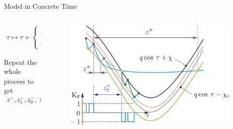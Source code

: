 \begin{frame}{Model in Concrete Time}
	\vspace{-1em}
	\begin{columns}
		\begin{column}{.5 \textwidth}
			\begin{align*}
				\tau \mapsto  \tau + \begin{cases}
					                     z^{+} + z_{1}^{+}     & \text{if } z^{+} \leq z_{0}^{+} \\
					                     z_{0}^{+} + z_{2}^{+} & \text{if } z^{+} > z_{0}^{+}
				                     \end{cases}
			\end{align*}
			\vspace{1em}

			Repeat the whole process to get
			\begin{align*}
				z^{-}, z_{1}^{-}, z_{0}^{-}, \text{ and } z_{2}^{-}
			\end{align*}
		\end{column}
		\begin{column}{.5 \textwidth}
			\begin{figure}
				\includegraphics[width=1 \textwidth]{Figs/discrete_model_derivation_cases.png}
			\end{figure}
		\end{column}
	\end{columns}

	\flushright{[Avrutin]}
\end{frame}

%
%
%
%
%

\thanksframe

